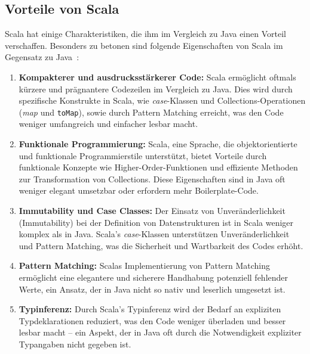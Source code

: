 \subsection{Vorteile von Scala}
Scala hat einige Charakteristiken, die ihm im Vergleich zu Java einen Vorteil verschaffen.
Besonders zu betonen sind folgende Eigenschaften von Scala im Gegensatz zu Java~\cite{epfl_scala_nodate-1, epfl_scala_nodate-2}: %

\begin{enumerate}
    \item \textbf{Kompakterer und ausdrucksstärkerer Code:} Scala ermöglicht oftmals kürzere und prägnantere Codezeilen im Vergleich zu Java. Dies wird durch spezifische Konstrukte in Scala, wie \emph{case}-Klassen und Collections-Operationen (\emph{map} und \texttt{toMap}), sowie durch Pattern Matching erreicht, was den Code weniger umfangreich und einfacher lesbar macht.
    
    \item \textbf{Funktionale Programmierung:} Scala, eine Sprache, die objektorientierte und funktionale Programmierstile unterstützt, bietet Vorteile durch funktionale Konzepte wie Higher-Order-Funktionen und effiziente Methoden zur Transformation von Collections. Diese Eigenschaften sind in Java oft weniger elegant umsetzbar oder erfordern mehr Boilerplate-Code.
    
    \item \textbf{Immutability und Case Classes:} Der Einsatz von Unveränderlichkeit (Immutability) bei der Definition von Datenstrukturen ist in Scala weniger komplex als in Java. Scala's \emph{case}-Klassen unterstützen Unveränderlichkeit und Pattern Matching, was die Sicherheit und Wartbarkeit des Codes erhöht.
    
    \item \textbf{Pattern Matching:} Scalas Implementierung von Pattern Matching ermöglicht eine elegantere und sicherere Handhabung potenziell fehlender Werte, ein Ansatz, der in Java nicht so nativ und leserlich umgesetzt ist.
    
    \item \textbf{Typinferenz:} Durch Scala's Typinferenz wird der Bedarf an expliziten Typdeklarationen reduziert, was den Code weniger überladen und besser lesbar macht – ein Aspekt, der in Java oft durch die Notwendigkeit expliziter Typangaben nicht gegeben ist.
\end{enumerate}


